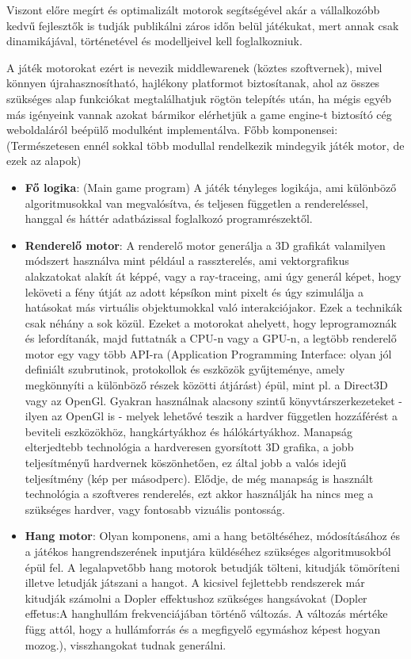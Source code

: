 \documentclass[colorlinks]{thesis-ekf}
\theoremstyle{definition}
\theoremstyle{remark}
\begin{document}
Viszont előre megírt és optimalizált motorok segítségével akár a vállalkozóbb kedvű fejlesztők is tudják publikálni záros időn belül játékukat, mert annak csak dinamikájával, történetével és modelljeivel kell foglalkozniuk.  

A játék motorokat ezért is nevezik middlewarenek (köztes szoftvernek), mivel könnyen újrahasznosítható, hajlékony platformot biztosítanak, ahol az összes szükséges alap funkciókat megtalálhatjuk rögtön telepítés után, ha mégis egyéb más igényeink vannak azokat bármikor elérhetjük a game engine-t biztosító cég weboldaláról beépülő modulként implementálva.
Főbb komponensei: (Természetesen ennél sokkal több modullal rendelkezik mindegyik játék motor, de ezek az alapok) \cite{wiki_game_engine}
\begin{itemize}
	\item \textbf{Fő logika}: (Main game program) A játék tényleges logikája, ami különböző algoritmusokkal van megvalósítva, és teljesen független a rendereléssel, hanggal és háttér adatbázissal foglalkozó programrészektől.\cite{wiki_game_engine}
	\item \textbf{Renderelő motor}: A renderelő motor generálja a 3D grafikát valamilyen módszert használva mint például a rasszterelés, ami vektorgrafikus alakzatokat alakít át képpé,\cite{wiki_raszt} vagy a ray-traceing, ami úgy generál képet, hogy leköveti a fény útját az adott képsíkon mint pixelt és úgy szimulálja a hatásokat más virtuális objektumokkal való interakciójakor.\cite{wiki_ray} Ezek a technikák csak néhány a sok közül.
	Ezeket a motorokat ahelyett, hogy leprogramoznák és lefordítanák, majd futtatnák a CPU-n vagy a GPU-n, a legtöbb renderelő motor egy vagy több API-ra (Application Programming Interface: olyan jól definiált szubrutinok, protokollok és eszközök gyűjteménye, amely megkönnyíti a különböző részek közötti átjárást) épül, mint pl. a Direct3D vagy az OpenGl.
	Gyakran használnak alacsony szintű könyvtárszerkezeteket - ilyen az OpenGl is - melyek lehetővé teszik a hardver független hozzáférést a beviteli eszközökhöz, hangkártyákhoz és hálókártyákhoz.
	Manapság elterjedtebb technológia a hardveresen gyorsított 3D grafika, a jobb teljesítményű hardvernek köszönhetően, ez által jobb a valós idejű teljesítmény (kép per másodperc). Elődje, de még manapság is használt technológia a szoftveres renderelés, ezt akkor használják ha nincs meg a szükséges hardver, vagy fontosabb vizuális pontosság.\cite{wiki_game_engine}
	\item \textbf{Hang motor}: Olyan komponens, ami a hang betöltéséhez, módosításához és a játékos hangrendszerének inputjára küldéséhez szükséges algoritmusokból épül fel. A legalapvetőbb hang motorok betudják tölteni, kitudják tömöríteni illetve letudják játszani a hangot. A kicsivel fejlettebb rendszerek már kitudják számolni a Dopler effektushoz szükséges hangsávokat (Dopler effetus:A hanghullám frekvenciájában történő változás. A változás mértéke függ attól, hogy a hullámforrás és a megfigyelő egymáshoz képest hogyan mozog.\cite{wiki_dop}), visszhangokat tudnak generálni. \cite{wiki_game_engine}

\end{itemize}
\end{document}
